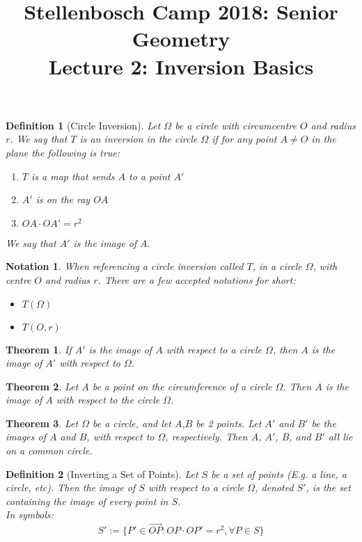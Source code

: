 \documentclass{article}
\title{Stellenbosch Camp 2018: Senior Geometry\\ \centering Lecture 2: Inversion Basics}
\date{}
\newtheorem{theorem}{Theorem}
\newtheorem*{definition}{Definition}
\newtheorem*{notate}{Notation}
\newcommand\ora[1]{\overrightarrow{#1}}
\begin{document}
	\maketitle
	\hrulefill
	\begin{definition}[Circle Inversion]
		Let $\Omega$ be a circle with circumcentre $O$ and radius $r$. We say that $T$ is an inversion in the circle $\Omega$ if for any point $A \neq O$ in the plane the following is true:
		\begin{enumerate}
			\item $T$ is a map that sends $A$ to a point $A'$
			\item $A'$ is on the ray $OA$
			\item $OA \cdot OA' = r^{2}$
		\end{enumerate}
		We say that $A'$ is the image of $A$.
	\end{definition}
	\begin{notate}
		When referencing a circle inversion called $T$, in a circle $\Omega$, with centre $O$ and radius $r$. There are a few accepted notations for short:
		\begin{itemize}
			\item $T(\Omega)$
			\item $T(O,r)$
		\end{itemize}
	\end{notate}
	\begin{theorem}
		If $A'$ is the image of $A$ with respect to a circle $\Omega$, then $A$ is the image of $A'$ with respect to $\Omega$.
	\end{theorem}
	\begin{theorem}
		Let $A$ be a point on the circumference of a circle $\Omega$. Then $A$ is the image of $A$ with respect to the circle $\Omega$.
	\end{theorem}
	\begin{theorem}
		Let $\Omega$ be a circle, and let $A$,$B$ be 2 points. Let $A'$ and $B'$ be the images of $A$ and $B$, with respect to $\Omega$, respectively. Then $A$, $A'$, $B$, and $B'$ all lie on a common circle.
	\end{theorem}
	\begin{definition}[Inverting a Set of Points]
		Let $S$ be a set of points (E.g. a line, a circle, etc). Then the image of $S$ with respect to a circle $\Omega$, denoted $S'$, is the set containing the image of every point in $S$.\\
		In symbols:
		$$ S' := \{ P' \in  \ora{OP} : OP \cdot OP' = r^{2},  \forall P \in S  \} $$
	\end{definition}
\end{document}
